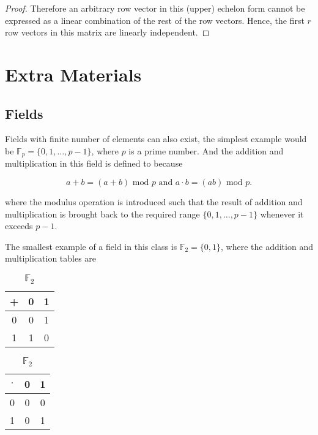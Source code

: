 \documentclass[a4paper,12pt]{report}
\begin{document}
\begin{appendices}
\begin{proof}
    Therefore an arbitrary row vector in this (upper) echelon form cannot be expressed as a linear combination of the rest of the row vectors. Hence, the first \(r\) row vectors in this matrix are linearly independent.         
    
\end{proof}







\chapter{Extra Materials}

\section{Fields} \label{fields} 

Fields with finite number of elements can also exist, the simplest example would be \(\mathbb{F}_{p} = \{0,1,\ldots ,p-1\} \), where \(p\) is a prime number. And the addition and multiplication in this field is defined to because

\begin{equation}
    a + b = (a+b) \text{ mod } p \text { and } a \cdot b = (ab) \text{ mod } p. 
\end{equation}

where the modulus operation is introduced such that the result of addition and multiplication is brought back to the required range \(\{0,1,\ldots ,p-1\}\) whenever it exceeds \(p-1\).

The smallest example of a field in this class is \(\mathbb{F} _{2}  = \{0,1\} \), where the addition and multiplication tables are


\begin{table}[H]
    \begin{minipage}[t]{0.5\linewidth}
    \centering
    \begin{tabular}{c|c|c}
        \toprule
          +   &  0  &  1 \\
        \midrule
          0   &  0  &  1 \\
          1   &  1  &  0 \\
        \bottomrule
    \end{tabular}
    \caption{ \(\mathbb{F}_{2}  \) }
\label{add}
\end{minipage} 
\begin{minipage}[t]{0.5\linewidth}
    \centering
    \begin{tabular}{c|c|c}
        \toprule
          \(\cdot \)    & 0 & 1  \\
        \midrule
            0 & 0 &  0 \\
            1 & 0 &  1 \\
        \bottomrule
    \end{tabular}
    \caption{ \(\mathbb{F}_{2}  \)  }
\label{mul}
\end{minipage}
\end{table}


\end{appendices}
\end{document}
